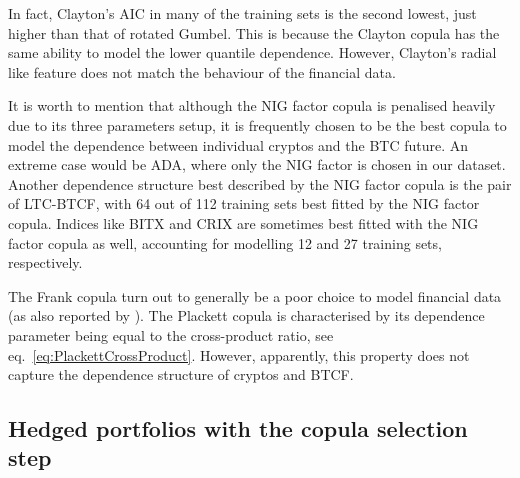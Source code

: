 In fact, Clayton's AIC in many of the training sets is the second
lowest, just higher than that of rotated Gumbel. This is because the
Clayton copula has the same ability to model the lower quantile
dependence. However, Clayton's radial like feature does not match the
behaviour of the financial data. 

It is worth to mention that although the NIG factor copula is
penalised heavily due to its three parameters setup, it is frequently
chosen to be the best copula to model the dependence between
individual cryptos and the BTC future. An extreme case would be ADA,
where only the NIG factor is chosen in our dataset. 
Another dependence structure best described by the NIG factor
copula is the pair of LTC-BTCF, with 64 out of 112 training sets best
fitted by the NIG factor copula. Indices like BITX and CRIX are
sometimes best fitted with the NIG factor copula as well, accounting
for modelling 12 and 27 training sets, respectively. 


The Frank copula turn out to generally be a poor choice to model financial
data (as also reported by \cite{barbi2014copula}).
The Plackett copula is characterised by its dependence parameter being
equal to the cross-product ratio, see
eq.~\ref{eq:PlackettCrossProduct}. However, apparently, this property
does not capture the dependence structure of cryptos and BTCF.


\subsection{Hedged portfolios with the copula selection step}\label{subsec:HP2}

\afterpage{
  \begin{landscape}
  
\end{landscape}
}

